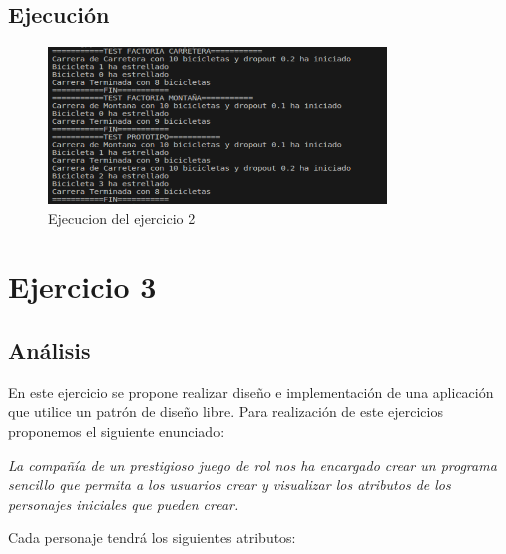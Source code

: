 \documentclass{article}
\begin{document}
\subsection{Ejecución}
\begin{figure}[h]
	\centering
        \vspace{5pt}
	\includegraphics[width=0.8\textwidth]{DS_ejecucion_ej2.png}
	\caption{Ejecucion del ejercicio 2}
	\label{fig:ej2}
\end{figure}



\newpage
\section{Ejercicio 3}
\subsection{Análisis}
En este ejercicio se propone realizar diseño e implementación de una aplicación que utilice un patrón de diseño libre. Para realización de este ejercicios proponemos el siguiente enunciado: 

\vspace{\baselineskip}

\emph{La compañía de un prestigioso juego de rol nos ha encargado crear un programa sencillo que permita a los usuarios crear y
visualizar los atributos de los personajes iniciales que pueden crear.}

\vspace{\baselineskip}

Cada personaje tendrá los siguientes atributos:
\end{document}
